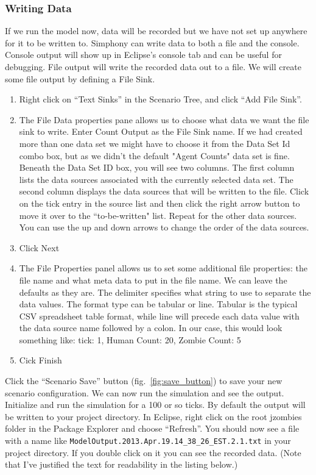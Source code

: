 \documentclass[11pt]{amsart}
\begin{document}
\subsubsection{Writing Data}

If we run the model now, data will be recorded but we have not set up anywhere for it to be written to.  Simphony can write data to both a file and the console. Console output will show up in Eclipse's console tab and can be useful for debugging. File output will write the recorded data out to a file. We will create some file output by defining a File Sink. 

\vspace{.2in}
\begin{enumerate}
\item Right click on ``Text Sinks'' in the Scenario Tree, and click ``Add File Sink''. 
\item The File Data properties pane allows us to choose what data we want the file sink to write. Enter Count Output as the File Sink name. If we had created more than one data set we might have to choose it from the Data Set Id combo box, but as we didn't the default "Agent Counts" data set is fine. Beneath the Data Set ID box, you will see two columns. The first column lists the data sources associated with the currently selected data set. The second column displays the data sources that will be written to the file. Click on the tick entry in the source list and then click the right arrow button to move it over to the ``to-be-written" list. Repeat for the other data sources. You can use the up and down arrows to change the order of the data sources.
\item Click Next
\item The File Properties panel allows us to set some additional file properties: the file name and what meta data to put in the file name. We can leave the defaults as they are. The delimiter specifies what string to use to separate the data values. The format type can be tabular or line. Tabular is the typical CSV spreadsheet table format, while line will precede each data value with the data source name followed by a colon. In our case, this would look something like: tick: 1, Human Count: 20, Zombie Count: 5
\item Cick Finish
\end{enumerate}
\vspace{.2in}

Click the ``Scenario Save''  button (fig.~\ref{fig:save_button}) to save your new scenario configuration. We can now run the simulation and see the output. Initialize and run the simulation for a 100 or so ticks. By default the output will be written to your project directory. In Eclipse, right click on the root jzombies folder in the Package Explorer and choose ``Refresh''. You should now see a file with a name like \texttt{ModelOutput.2013.Apr.19.14\_38\_26\_EST.2.1.txt} in your project directory. If you double click on it you can see the recorded data. (Note that I've justified the text for readability in the listing below.)
\end{document}
